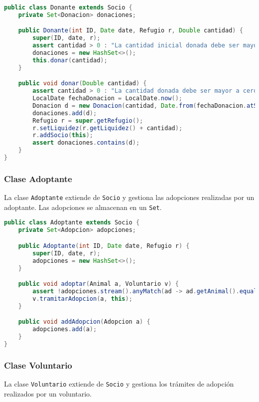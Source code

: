 \begin{lstlisting}[language=Java]
public class Donante extends Socio {
    private Set<Donacion> donaciones;

    public Donante(int ID, Date date, Refugio r, Double cantidad) {
        super(ID, date, r);
        assert cantidad > 0 : "La cantidad inicial donada debe ser mayor a cero.";
        donaciones = new HashSet<>();
        this.donar(cantidad);
    }

    public void donar(Double cantidad) {
        assert cantidad > 0 : "La cantidad donada debe ser mayor a cero.";
        LocalDate fechaDonacion = LocalDate.now();
        Donacion d = new Donacion(cantidad, Date.from(fechaDonacion.atStartOfDay(ZoneId.systemDefault()).toInstant()), this);
        donaciones.add(d);
        Refugio r = super.getRefugio();
        r.setLiquidez(r.getLiquidez() + cantidad);
        r.addSocio(this);
        assert donaciones.contains(d);
    }
}
\end{lstlisting}

\subsubsection{Clase Adoptante}
La clase \texttt{Adoptante} extiende de \texttt{Socio} y gestiona las adopciones realizadas por un adoptante. Las adopciones se almacenan en un \texttt{Set}.

\begin{lstlisting}[language=Java]
public class Adoptante extends Socio {
    private Set<Adopcion> adopciones;

    public Adoptante(int ID, Date date, Refugio r) {
        super(ID, date, r);
        adopciones = new HashSet<>();
    }

    public void adoptar(Animal a, Voluntario v) {
        assert !adopciones.stream().anyMatch(ad -> ad.getAnimal().equals(a)) : "El adoptante ya tiene registrado este animal";
        v.tramitarAdopcion(a, this);
    }

    public void addAdopcion(Adopcion a) {
        adopciones.add(a);
    }
}
\end{lstlisting}

\subsubsection{Clase Voluntario}
La clase \texttt{Voluntario} extiende de \texttt{Socio} y gestiona los trámites de adopción realizados por un voluntario.

